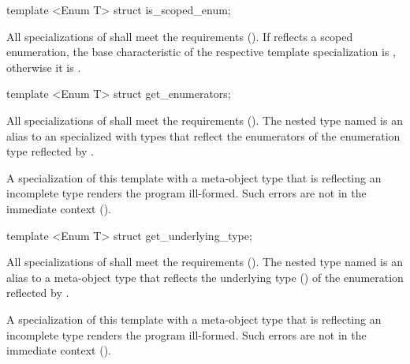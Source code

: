 \begin{std.txt}\color{addclr}

\begin{itemdecl}
template <Enum T> struct is_scoped_enum;
\end{itemdecl}

\begin{itemdescr}
\pnum
All specializations of  shall meet the  requirements (). If  reflects a scoped enumeration, the base characteristic of the respective template specialization is , otherwise it is .

\end{itemdescr}

\begin{itemdecl}
template <Enum T> struct get_enumerators;
\end{itemdecl}

\begin{itemdescr}
\pnum
All specializations of  shall meet the  requirements (). The nested type named  is an alias to an  specialized with  types that reflect the enumerators of the enumeration type reflected by .

\pnum
\remarks
A specialization of this template with a meta-object type that is reflecting an incomplete type renders the program ill-formed.
      Such errors are not in the immediate context ().
\end{itemdescr}

\begin{itemdecl}
template <Enum T> struct get_underlying_type;
\end{itemdecl}

\begin{itemdescr}
\pnum
All specializations of  shall meet the
 requirements (). The nested type named
 is an alias to a meta-object type that reflects the underlying type
() of the enumeration reflected by .

\pnum
\remarks
A specialization of this template with a meta-object type that is reflecting an incomplete type renders the program ill-formed.
      Such errors are not in the immediate context ().
\end{itemdescr}
\end{std.txt}

